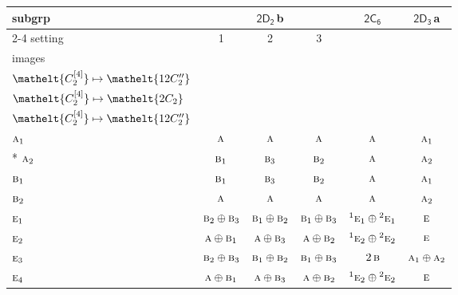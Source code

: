 \documentclass[10pt,a4paper]{article}
\numberwithin{equation}{section}
\newcommand{\eltfont}[1]{{\let\sigma\eltsigma\mathelt{#1}}}
\newcommand{\grp}[1]{\mathsf{#1}}
\newcommand{\irr}[1]{\text{\normalfont\scshape #1}}
\newcommand{\conjpair}[1]{{}^{#1}}
\newcommand{\cls}[1]{\eltfont{#1}}
\newcommand{\clsletter}[1]{\,{\scriptsize\color{black!55}#1}}
\newcommand{\genidx}[2]{#1^{[\mathrm{#2}]}}
\begin{document}
{\small\begin{longtable}{@{}lccccc@{}}\toprule
subgrp & \multicolumn{3}{c}{\href{2D2.pdf}{$\grp{2D_{2}}$}\clsletter{b}} & \href{2C6.pdf}{$\grp{2C_{6}}$} & \href{2D3.pdf}{$\grp{2D_{3}}$}\clsletter{a}\\\cmidrule(lr){2-4}
setting & 1 & 2 & 3 &  & \\
images & {\scriptsize\begin{tabular}[t]{@{}c@{}}$\cls{\genidx{C_{2}}{2}} \mapsto \cls{2C_{2}}$\\$\cls{\genidx{C_{2}}{4}} \mapsto \cls{12C_{2}''}$\end{tabular}} & {\scriptsize\begin{tabular}[t]{@{}c@{}}$\cls{\genidx{C_{2}}{2}} \mapsto \cls{12C_{2}''}$\\$\cls{\genidx{C_{2}}{4}} \mapsto \cls{2C_{2}}$\end{tabular}} & {\scriptsize\begin{tabular}[t]{@{}c@{}}$\cls{\genidx{C_{2}}{2}} \mapsto \cls{12C_{2}''}$\\$\cls{\genidx{C_{2}}{4}} \mapsto \cls{12C_{2}''}$\end{tabular}} &  & \\\midrule\endhead
\bottomrule\endfoot\endlastfoot
$\irr{a}_{1}$ & $\irr{a}$ & $\irr{a}$ & $\irr{a}$ & $\irr{a}$ & $\irr{a}_{1}$\\*
$\irr{a}_{2}$ & $\irr{b}_{1}$ & $\irr{b}_{3}$ & $\irr{b}_{2}$ & $\irr{a}$ & $\irr{a}_{2}$\\
$\irr{b}_{1}$ & $\irr{b}_{1}$ & $\irr{b}_{3}$ & $\irr{b}_{2}$ & $\irr{a}$ & $\irr{a}_{1}$\\
$\irr{b}_{2}$ & $\irr{a}$ & $\irr{a}$ & $\irr{a}$ & $\irr{a}$ & $\irr{a}_{2}$\\
$\irr{e}_{1}$ & $\irr{b}_{2}\oplus \irr{b}_{3}$ & $\irr{b}_{1}\oplus \irr{b}_{2}$ & $\irr{b}_{1}\oplus \irr{b}_{3}$ & $\conjpair{1}\irr{e}_{1}\oplus \conjpair{2}\irr{e}_{1}$ & $\irr{e}$\\
$\irr{e}_{2}$ & $\irr{a}\oplus \irr{b}_{1}$ & $\irr{a}\oplus \irr{b}_{3}$ & $\irr{a}\oplus \irr{b}_{2}$ & $\conjpair{1}\irr{e}_{2}\oplus \conjpair{2}\irr{e}_{2}$ & $\irr{e}$\\
$\irr{e}_{3}$ & $\irr{b}_{2}\oplus \irr{b}_{3}$ & $\irr{b}_{1}\oplus \irr{b}_{2}$ & $\irr{b}_{1}\oplus \irr{b}_{3}$ & $2\,\irr{b}$ & $\irr{a}_{1}\oplus \irr{a}_{2}$\\
$\irr{e}_{4}$ & $\irr{a}\oplus \irr{b}_{1}$ & $\irr{a}\oplus \irr{b}_{3}$ & $\irr{a}\oplus \irr{b}_{2}$ & $\conjpair{1}\irr{e}_{2}\oplus \conjpair{2}\irr{e}_{2}$ & $\irr{e}$\\

\end{longtable}}
\end{document}
